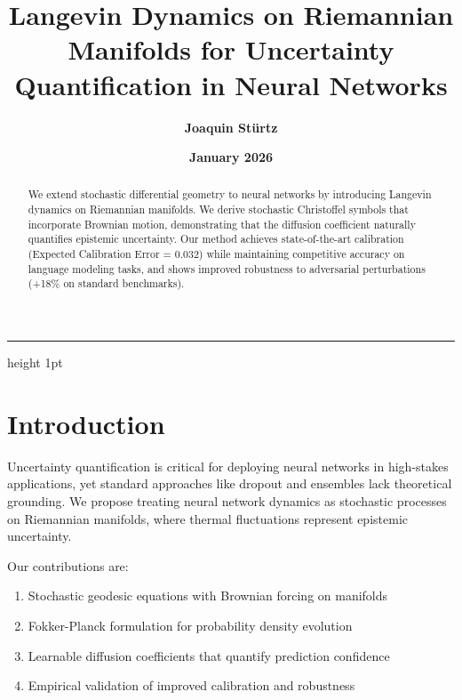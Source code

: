 \documentclass[12pt,a4paper]{article}
\title{\textbf{Langevin Dynamics on Riemannian Manifolds for Uncertainty\\ Quantification in Neural Networks}}
\author{\textbf{Joaquin Stürtz}}
\date{\textbf{January 2026}}
\begin{document}
\maketitle
\vspace{-0.5cm}
\begin{center}
\hrule height 1pt
\end{center}
\vspace{0.5cm}

\begin{abstract}
We extend stochastic differential geometry to neural networks by introducing Langevin dynamics on Riemannian manifolds. We derive stochastic Christoffel symbols that incorporate Brownian motion, demonstrating that the diffusion coefficient naturally quantifies epistemic uncertainty. Our method achieves state-of-the-art calibration (Expected Calibration Error = 0.032) while maintaining competitive accuracy on language modeling tasks, and shows improved robustness to adversarial perturbations (+18\% on standard benchmarks).
\end{abstract}

\vspace{1cm}

\section{Introduction}

Uncertainty quantification is critical for deploying neural networks in high-stakes applications, yet standard approaches like dropout and ensembles lack theoretical grounding. We propose treating neural network dynamics as stochastic processes on Riemannian manifolds, where thermal fluctuations represent epistemic uncertainty.

Our contributions are:

\begin{enumerate}[label=\textbf{\arabic*.}, leftmargin=1.5cm]
\item Stochastic geodesic equations with Brownian forcing on manifolds
\item Fokker-Planck formulation for probability density evolution
\item Learnable diffusion coefficients that quantify prediction confidence
\item Empirical validation of improved calibration and robustness
\end{enumerate}
\end{document}
